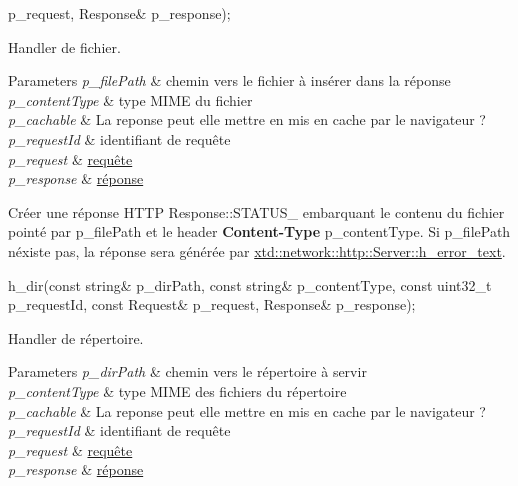 \begin{DoxyItemize}
\begin{DoxyCode}
      p\_request, Response& p\_response); 
\end{DoxyCode}
 Handler de fichier. 
\begin{DoxyParams}{Parameters}
{\em p\+\_\+file\+Path} & chemin vers le fichier à insérer dans la réponse \\
\hline
{\em p\+\_\+content\+Type} & type M\+I\+ME du fichier \\
\hline
{\em p\+\_\+cachable} & La reponse peut elle mettre en mis en cache par le navigateur ? \\
\hline
{\em p\+\_\+request\+Id} & identifiant de requête \\
\hline
{\em p\+\_\+request} & \hyperlink{classxtd_1_1network_1_1http_1_1Request}{requête} \\
\hline
{\em p\+\_\+response} & \hyperlink{classxtd_1_1network_1_1http_1_1Response}{réponse}\\
\hline
\end{DoxyParams}
Créer une réponse H\+T\+TP Response\+::\+S\+T\+A\+T\+U\+S\+\_ embarquant le contenu du fichier pointé par p\+\_\+file\+Path et le header {\bfseries Content-\/\+Type} p\+\_\+content\+Type. Si p\+\_\+file\+Path n\textquotesingle{}éxiste pas, la réponse sera générée par \hyperlink{classxtd_1_1network_1_1http_1_1Server_ad57a524ff44201af997e2d3557557623}{xtd\+::network\+::http\+::\+Server\+::h\+\_\+error\+\_\+text}.
\item 
\begin{DoxyCode}
h\_dir(\textcolor{keyword}{const} \textcolor{keywordtype}{string}& p\_dirPath, \textcolor{keyword}{const} \textcolor{keywordtype}{string}& p\_contentType, \textcolor{keyword}{const} uint32\_t p\_requestId, \textcolor{keyword}{const} Request& 
      p\_request, Response& p\_response); 
\end{DoxyCode}
 Handler de répertoire. 
\begin{DoxyParams}{Parameters}
{\em p\+\_\+dir\+Path} & chemin vers le répertoire à servir \\
\hline
{\em p\+\_\+content\+Type} & type M\+I\+ME des fichiers du répertoire \\
\hline
{\em p\+\_\+cachable} & La reponse peut elle mettre en mis en cache par le navigateur ? \\
\hline
{\em p\+\_\+request\+Id} & identifiant de requête \\
\hline
{\em p\+\_\+request} & \hyperlink{classxtd_1_1network_1_1http_1_1Request}{requête} \\
\hline
{\em p\+\_\+response} & \hyperlink{classxtd_1_1network_1_1http_1_1Response}{réponse}\\

\end{DoxyParams}
\end{DoxyItemize}
